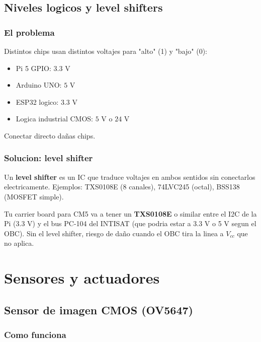 \documentclass[11pt,a4paper,oneside,openright]{book}
\begin{document}
\chapter{Niveles logicos y level shifters}

\section{El problema}

Distintos chips usan distintos voltajes para "alto" (1) y "bajo" (0):
\begin{itemize}[leftmargin=2em]
  \item Pi 5 GPIO: $3.3$ V
  \item Arduino UNO: $5$ V
  \item ESP32 logico: $3.3$ V
  \item Logica industrial CMOS: $5$ V o $24$ V
\end{itemize}

Conectar directo dañas chips.

\section{Solucion: level shifter}

Un \textbf{level shifter} es un IC que traduce voltajes en ambos sentidos
sin conectarlos electricamente. Ejemplos: TXS0108E (8 canales),
74LVC245 (octal), BSS138 (MOSFET simple).

\begin{payload}
Tu carrier board para CM5 va a tener un \textbf{TXS0108E} o similar entre
el I2C de la Pi (3.3 V) y el bus PC-104 del INTISAT (que podria estar a
3.3 V o 5 V segun el OBC). Sin el level shifter, riesgo de daño cuando
el OBC tira la linea a $V_{cc}$ que no aplica.
\end{payload}

\part{Sensores y actuadores}

\chapter{Sensor de imagen CMOS (OV5647)}

\section{Como funciona}
\end{document}
